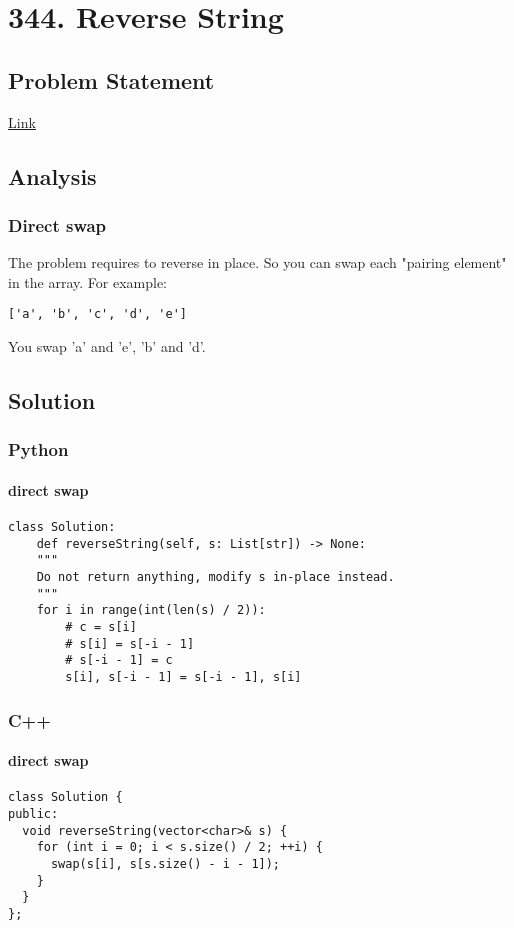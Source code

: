 \documentclass[12pt]{article}
\begin{document}
\section{344. Reverse String}
\label{sec:org46f2d81}
\subsection{Problem Statement}
\label{sec:org6bd67a4}
\href{https://leetcode.com/problems/reverse-string/}{Link}
\subsection{Analysis}
\label{sec:org7d83b86}
\subsubsection{Direct swap}
\label{sec:org92b8630}
The problem requires to reverse in place. So you can swap each "pairing element" in the array. For example:
\begin{verbatim}
['a', 'b', 'c', 'd', 'e']
\end{verbatim}
You swap 'a' and 'e', 'b' and 'd'.

\subsection{Solution}
\label{sec:org06817ae}
\subsubsection{Python}
\label{sec:orgb7d3cfb}
\paragraph{direct swap}
\label{sec:org8e4fb5b}
\begin{verbatim}
class Solution:
    def reverseString(self, s: List[str]) -> None:
	"""
	Do not return anything, modify s in-place instead.
	"""
	for i in range(int(len(s) / 2)):
	    # c = s[i]
	    # s[i] = s[-i - 1]
	    # s[-i - 1] = c
	    s[i], s[-i - 1] = s[-i - 1], s[i]
\end{verbatim}
\subsubsection{C++}
\label{sec:org643be4d}
\paragraph{direct swap}
\label{sec:orgcc5d367}
\begin{verbatim}
class Solution {
public:
  void reverseString(vector<char>& s) {
    for (int i = 0; i < s.size() / 2; ++i) {
      swap(s[i], s[s.size() - i - 1]);
    }
  }
};
\end{verbatim}
\end{document}
